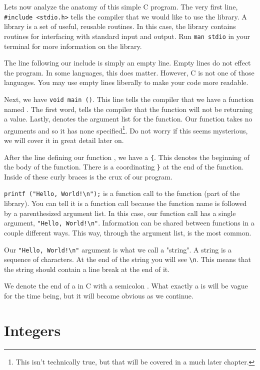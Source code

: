 Lets now analyze the anatomy of this simple C program. The very first line,
\verb|#include <stdio.h>| tells the compiler that we would like to use the
 library. A library is a set of useful, reusable routines. In this
case, the  library contains routines for interfacing with standard
input and output. Run \verb|man stdio| in your terminal for more information on
the  library.

The line following our include is simply an empty line. Empty lines do not
effect the program. In some languages, this does matter. However, C is not one
of those languages. You may use empty lines liberally to make your code more
readable.

Next, we have \verb|void main ()|. This line tells the compiler that we have a
function named . The first word,  tells the compiler
that the function will not be returning a value. Lastly, \ident{()} denotes the
argument list for the function. Our  function takes no arguments
and so it has none specified\footnote[1]{This isn't technically true, but that
will be covered in a much later chapter.}. Do not worry if this seems
mysterious, we will cover it in great detail later on.

After the line defining our function , we have a \verb|{|. This
denotes the beginning of the body of the function. There is a coordinating
\verb|}| at the end of the function. Inside of these curly braces is the crux
of our program.

\verb|printf ("Hello, World!\n");| is a function call to the 
function (part of the  library). You can tell it is a function
call because the function name is followed by a parenthesized argument list.
In this case, our function call has a single argument,
\verb|"Hello, World!\n"|. Information can be shared between functions in
a couple different ways. This way, through the argument list, is the most
common.

Our \verb|"Hello, World!\n"| argument is what we call a "string". A string
is a sequence of characters. At the end of the string you will see \verb|\n|.
This means that the string should contain a line break at the end of it.

We denote the end of a  in C with a semicolon \ident{;}.
What exactly a  is will be vague for the time being, but it
will become obvious as we continue.

\section{Integers}

